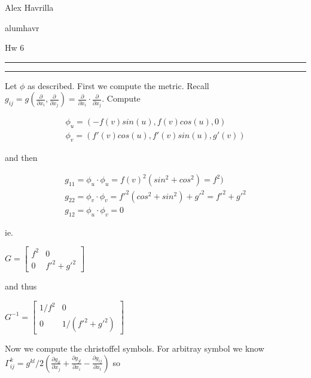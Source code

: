 \documentclass[11pt]{article}
\newcommand{\del}{\partial}
\newcommand{\question}[2] {\vspace{.25in} \hrule\vspace{0.5em}
\noindent{\bf #1: #2} \vspace{0.5em}
\hrule \vspace{.10in}}
\newcommand{\myname}{Alex Havrilla}
\newcommand{\myandrew}{alumhavr}
\newcommand{\myhwnum}{Hw 6}
\begin{document}
\medskip                        

\thispagestyle{plain}
\begin{center}

{\myname}

\myandrew

\myhwnum

\end{center}

\question{Question 1}

\textbf{Geodesics of a Surface of Revolution}

Let $\phi$ as described. First we compute the metric. Recall $g_{ij} = g(\frac{\del}{\del x_i},\frac{\del}{\del x_j}) = \frac{\del}{\del x_i} \cdot \frac{\del}{\del x_j}$. Compute

\begin{align*}
	\phi_u = (-f(v)sin(u),f(v)cos(u),0)\\
	\phi_v = (f'(v)cos(u),f'(v)sin(u),g'(v))
\end{align*}

and then


\begin{align*}
g_{11} = \phi_u \cdot \phi_u =f(v)^2(sin^2+cos^2) = f^2)	
\\
g_{22} = \phi_v \cdot \phi_v = f'^2(cos^2+sin^2)+g'^2=f'^2 + g'^2\\
g_{12} = \phi_u \cdot \phi_v = 0
\end{align*}

ie.

\begin{center}
	$G = \begin{bmatrix}
		f^2 & 0 \\
		0 & f'^2 + g'^2
	\end{bmatrix}$
\end{center}

and thus

\begin{center}
	$G^{-1} = \begin{bmatrix}
		1/f^2 & 0 \\
		0 & 1/(f'^2 + g'^2)
	\end{bmatrix}$
\end{center}

Now we compute the christoffel symbols. For arbitray symbol we know $\Gamma_{ij}^k = g^{kl}/2(\frac{\del g_{il}}{\del x_j} + \frac{\del g_{jl}}{\del x_i} - \frac{\del g_{ij}}{\del x_l})$ so
\end{document}
